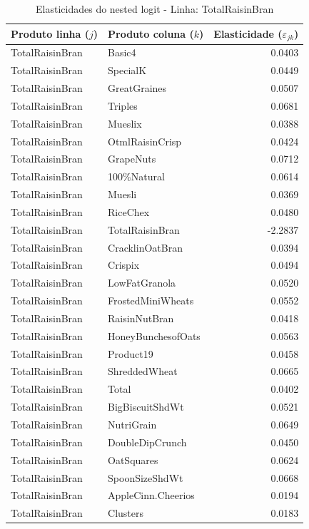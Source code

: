 \begingroup
\begin{table}[H]
\centering
\caption{Elasticidades do nested logit - Linha: TotalRaisinBran}
\label{tab:elas-nested-totalraisinbran}
\small
\begin{tabular}{llr}
\toprule
Produto linha ($j$) & Produto coluna ($k$) & Elasticidade ($\varepsilon_{jk}$) \\
\midrule
TotalRaisinBran & Basic4 & 0.0403 \\
TotalRaisinBran & SpecialK & 0.0449 \\
TotalRaisinBran & GreatGraines & 0.0507 \\
TotalRaisinBran & Triples & 0.0681 \\
TotalRaisinBran & Mueslix & 0.0388 \\
TotalRaisinBran & OtmlRaisinCrisp & 0.0424 \\
TotalRaisinBran & GrapeNuts & 0.0712 \\
TotalRaisinBran & 100\%Natural & 0.0614 \\
TotalRaisinBran & Muesli & 0.0369 \\
TotalRaisinBran & RiceChex & 0.0480 \\
TotalRaisinBran & TotalRaisinBran & -2.2837 \\
TotalRaisinBran & CracklinOatBran & 0.0394 \\
TotalRaisinBran & Crispix & 0.0494 \\
TotalRaisinBran & LowFatGranola & 0.0520 \\
TotalRaisinBran & FrostedMiniWheats & 0.0552 \\
TotalRaisinBran & RaisinNutBran & 0.0418 \\
TotalRaisinBran & HoneyBunchesofOats & 0.0563 \\
TotalRaisinBran & Product19 & 0.0458 \\
TotalRaisinBran & ShreddedWheat & 0.0665 \\
TotalRaisinBran & Total & 0.0402 \\
TotalRaisinBran & BigBiscuitShdWt & 0.0521 \\
TotalRaisinBran & NutriGrain & 0.0649 \\
TotalRaisinBran & DoubleDipCrunch & 0.0450 \\
TotalRaisinBran & OatSquares & 0.0624 \\
TotalRaisinBran & SpoonSizeShdWt & 0.0668 \\
TotalRaisinBran & AppleCinn.Cheerios & 0.0194 \\
TotalRaisinBran & Clusters & 0.0183 \\

\end{tabular}
\end{table}
